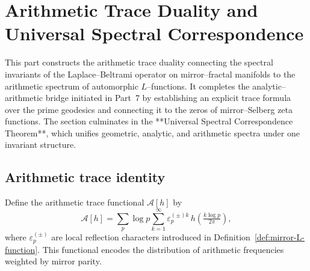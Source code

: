 

\section{Arithmetic Trace Duality and Universal Spectral Correspondence}
\label{sec:ch6-part8-arithmetic-trace-duality} \relax \hspace{0pt}

This part constructs the arithmetic trace duality connecting the spectral invariants of the Laplace–Beltrami operator on mirror–fractal manifolds to the arithmetic spectrum of automorphic $L$–functions.  
It completes the analytic–arithmetic bridge initiated in Part~7 by establishing an explicit trace formula over the prime geodesics and connecting it to the zeros of mirror–Selberg zeta functions.  
The section culminates in the **Universal Spectral Correspondence Theorem**, which unifies geometric, analytic, and arithmetic spectra under one invariant structure. %
\FlowBreaker

\subsection{Arithmetic trace identity}
\label{subsec:ch6-part8-trace-identity} \relax

\begin{definition}
\label{def:arithmetic-trace}
Define the arithmetic trace functional $\mathcal{A}[h]$ by
\[
\mathcal{A}[h]
=\sum_{p}\log p \sum_{k=1}^{\infty} 
\varepsilon_p^{(\pm)k}\,h\!\left(\tfrac{k\log p}{2\pi}\right),
\]
where $\varepsilon_p^{(\pm)}$ are local reflection characters introduced in Definition~\ref{def:mirror-L-function}.  
This functional encodes the distribution of arithmetic frequencies weighted by mirror parity. %
\end{definition}

